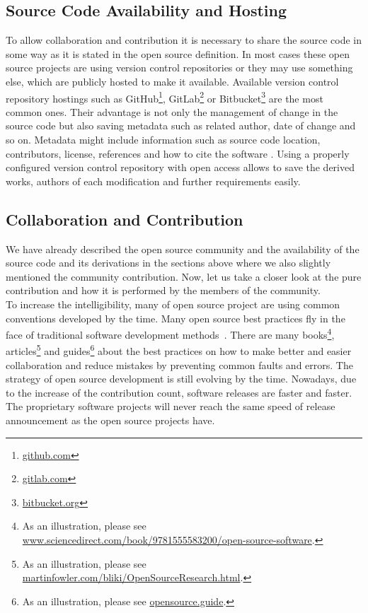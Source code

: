 \documentclass[12pt,a4paper]{article}
\theoremstyle{definition}
\begin{document}
    \subsection{Source Code Availability and Hosting}

    To allow collaboration and contribution it is necessary to share the source code in some way as it is stated in the open source definition. In most cases these open source projects are using version control repositories or they may use something else, which are publicly hosted to make it available. Available version control repository hostings such as GitHub\footnote{\href{https://github.com/}{github.com}}, GitLab\footnote{\href{https://gitlab.com/}{gitlab.com}} or Bitbucket\footnote{\href{https://bitbucket.org/}{bitbucket.org}} are the most common ones. Their advantage is not only the management of change in the source code but also saving metadata such as related author, date of change and so on. Metadata might include information such as source code location, contributors, license, references and how to cite the software \cite{IEEE:OS-BP}. Using a properly configured version control repository with open access allows to save the derived works, authors of each modification and further requirements easily.

    \subsection{Collaboration and Contribution}

    We have already described the open source community and the availability of the source code and its derivations in the sections above where we also slightly mentioned the community contribution. Now, let us take a closer look at the pure contribution and how it is performed by the members of the community.\\

    To increase the intelligibility, many of open source project are using common conventions developed by the time. Many open source best practices fly in the face of traditional software development methods~\cite{KATSAMAKAS2019100872}. There are many books\footnote{As an illustration, please see \href{https://www.sciencedirect.com/book/9781555583200/open-source-software}{www.sciencedirect.com/book/9781555583200/open-source-software}.}, articles\footnote{As an illustration, please see \href{https://martinfowler.com/bliki/OpenSourceResearch.html}{martinfowler.com/bliki/OpenSourceResearch.html}.} and guides\footnote{As an illustration, please see \href{https://opensource.guide/}{opensource.guide}.} about the best practices on how to make better and easier collaboration and reduce mistakes by preventing common faults and errors. The strategy of open source development is still evolving by the time. Nowadays, due to the increase of the contribution count, software releases are faster and faster. The proprietary software projects will never reach the same speed of release announcement as the open source projects have.
\end{document}
